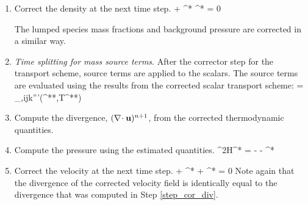 \begin{enumerate}

\item Correct the density at the next time step.
\be
{} +  \nabla\!\cdot \rho^* \bu^* = 0
\ee

The lumped species mass fractions and background pressure are corrected in a similar way.

\item \emph{Time splitting for mass source terms}. After the corrector step for the transport scheme, source terms are applied to the scalars.  The source terms are evaluated using the results from the corrected scalar transport scheme:
\be
{} =  \dm_{\alpha,ijk}'''(^{**},T^{**})
\ee

\item \label{step_cor_div} Compute the divergence, $(\nabla\!\cdot {\bf u})^{n+1}$, from the corrected thermodynamic quantities.

\item Compute the pressure using the estimated quantities.
\be
\label{eqn_corrector_poisson2}
\nabla^2{\cal H}^* = - 
   - \nabla\!\cdot {}^*
\ee

\item Correct the velocity at the next time step.
\be
{} + ^* + ^*  = 0
\ee
Note again that the divergence of the corrected velocity field is identically equal to the divergence that was computed in Step \ref{step_cor_div}.


\end{enumerate}

